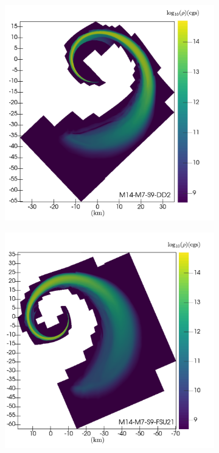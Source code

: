 \begin{figure}
	\centering
	\begin{subfigure}[b]{0.475\textwidth}
		\centering
		\includegraphics[width=1.0\linewidth]{images/rho_DD2_M14-merger-inertial}
		\label{fig:rho_M14_DD2}
	\end{subfigure}
	\begin{subfigure}[b]{0.475\textwidth}
		\centering
		\includegraphics[width=\linewidth]{images/rho_FSU21_M14-merger-inertial}

\end{subfigure}
\end{figure}
